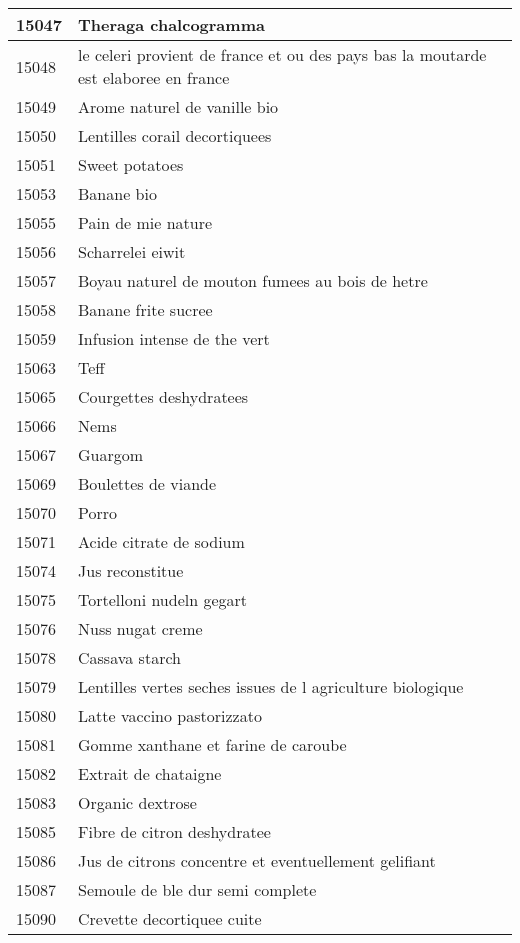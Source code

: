\begin{longtable}{|l|l|}
15047 & Theraga chalcogramma \\ \hline 
15048 & le celeri provient de france et ou des pays bas la moutarde est elaboree en france \\ \hline 
15049 & Arome naturel de vanille  bio \\ \hline 
15050 & Lentilles corail decortiquees \\ \hline 
15051 & Sweet potatoes \\ \hline 
15053 & Banane bio \\ \hline 
15055 & Pain de mie nature \\ \hline 
15056 & Scharrelei eiwit \\ \hline 
15057 & Boyau naturel de mouton fumees au bois de hetre \\ \hline 
15058 & Banane frite sucree \\ \hline 
15059 & Infusion intense de the vert \\ \hline 
15063 & Teff \\ \hline 
15065 & Courgettes deshydratees \\ \hline 
15066 & Nems \\ \hline 
15067 & Guargom \\ \hline 
15069 & Boulettes de viande \\ \hline 
15070 & Porro \\ \hline 
15071 & Acide citrate de sodium \\ \hline 
15074 & Jus reconstitue \\ \hline 
15075 & Tortelloni nudeln gegart \\ \hline 
15076 & Nuss nugat creme \\ \hline 
15078 & Cassava starch \\ \hline 
15079 & Lentilles vertes seches issues de l agriculture biologique \\ \hline 
15080 & Latte vaccino pastorizzato \\ \hline 
15081 & Gomme xanthane et farine de caroube \\ \hline 
15082 & Extrait de chataigne \\ \hline 
15083 & Organic dextrose \\ \hline 
15085 & Fibre de citron deshydratee \\ \hline 
15086 & Jus de citrons concentre et eventuellement gelifiant \\ \hline 
15087 & Semoule de ble dur semi complete \\ \hline 
15090 & Crevette decortiquee cuite \\ \hline 

\end{longtable}
